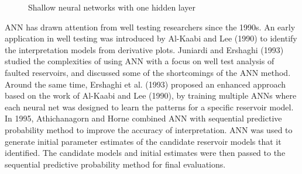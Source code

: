 \documentclass[12pt,a4paper]{report}
\def\layersep{2.5cm}
\begin{document}
\begin{figure}[H]
\centering
{}
\centering
\caption{Shallow neural networks with one hidden layer}
\end{figure}
ANN has drawn attention from well testing researchers since the 1990s. An early application in well testing was introduced by Al-Kaabi and Lee (1990) to identify the interpretation models from derivative plots. Juniardi and Ershaghi (1993) studied the complexities of using ANN with a focus on well test analysis of faulted reservoirs, and discussed some of the shortcomings of the ANN method. Around the same time, Ershaghi et al. (1993) proposed an enhanced approach based on the work of Al-Kaabi and Lee (1990), by training multiple ANNs where each neural net was designed to learn the patterns for a specific reservoir model. In 1995, Athichanagorn and Horne combined ANN with sequential predictive probability method to improve the accuracy of interpretation. ANN was used to generate initial parameter estimates of the candidate reservoir models that it identified. The candidate models and initial estimates were then passed to the sequential predictive probability method for final evaluations.
\end{document}

